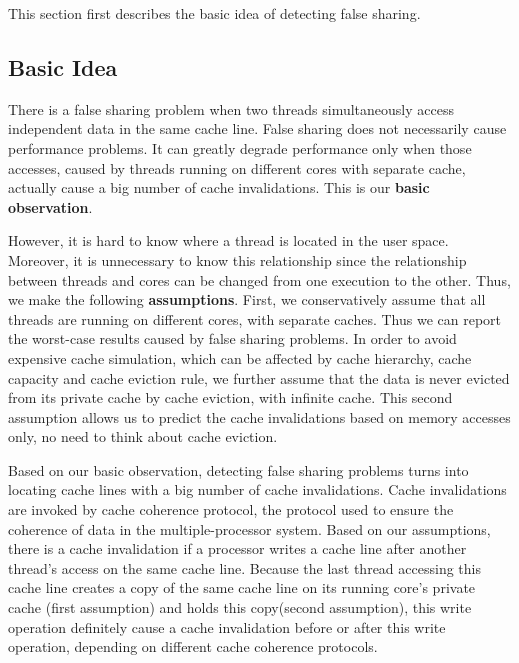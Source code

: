 \label{sec:detectfalseshare}

This section first describes the basic idea of detecting false sharing. 

\subsection{Basic Idea}
\label{sec:detectionidea}

There is a false sharing problem when two threads simultaneously access independent data in the same cache line. False sharing does not necessarily cause performance problems. It can greatly degrade performance only when those accesses, caused by threads running on different cores with separate cache, actually cause a big number of cache invalidations. This is our \textbf{basic observation}. 

However, it is hard to know where a thread is located in the user space. Moreover, it is unnecessary to know this relationship since the relationship between threads and cores can be changed from one execution to the other. Thus, we make the following \textbf{assumptions}. First, we conservatively assume that all threads are running on different cores, with separate caches. Thus we can report the worst-case results caused by false sharing problems. In order to avoid expensive cache simulation, which can be affected by cache hierarchy, cache capacity and cache eviction rule, we further assume that the data is never evicted from its private cache by cache eviction, with infinite cache. This second assumption allows us to predict the cache invalidations based on memory accesses only, no need to think about cache eviction.   

Based on our basic observation, detecting false sharing problems turns into locating cache lines with a big number of cache invalidations. Cache invalidations are invoked by cache coherence protocol, the protocol used to ensure the coherence of data in the multiple-processor system. Based on our assumptions, there is a cache invalidation if a processor writes a cache line after another thread's access on the same cache line. Because the last thread accessing this cache line creates a copy of the same cache line on its running core's private cache (first assumption) and  holds this copy(second assumption), this write operation definitely cause a cache invalidation before or after this write operation, depending on different cache coherence protocols. 

